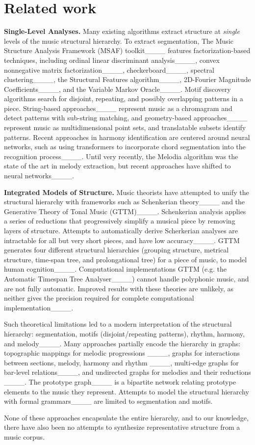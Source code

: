 \section{Related work}
\label{sec:related_work}

\noindent\textbf{Single-Level Analyses.}
Many existing algorithms extract structure at \textit{single} levels of the music structural hierarchy. To extract segmentation, The Music Structure Analysis Framework (MSAF) toolkit____ features factorization-based techniques, including ordinal linear discriminant analysis____, convex nonnegative matrix factorization____, checkerboard____, spectral clustering____, the Structural Features algorithm____, 2D-Fourier Magnitude Coefficients____, and the Variable Markov Oracle____. Motif discovery algorithms search for disjoint, repeating, and possibly overlapping patterns in a piece. String-based approaches____ represent music as a chromagram and detect patterns with sub-string matching, and geometry-based approaches____ represent music as multidimensional point sets, and translatable subsets identify patterns. Recent approaches in harmony identification are centered around neural networks, such as using transformers to incorporate chord segmentation into the recognition process____. Until very recently, the Melodia algorithm was the state of the art in melody extraction, but recent approaches have shifted to neural networks____. 

\smallskip\noindent\textbf{Integrated Models of Structure.}
Music theorists have attempted to unify the structural hierarchy with frameworks such as Schenkerian theory____ and the Generative Theory of Tonal Music (GTTM)____. Schenkerian analysis applies a series of reductions that progressively simplify a musical piece by removing layers of structure. Attempts to automatically derive Scherkerian analyses are intractable for all but very short pieces, and have low accuracy____. GTTM generates four different structural hierarchies (grouping structure, metrical structure, time-span tree, and prolongational tree) for a piece of music, to model human cognition____. Computational implementations GTTM (e.g. the Automatic Timespan Tree Analyser____) cannot handle polyphonic music, and are not fully automatic. Improved results with these theories are unlikely, as neither gives the precision required for complete computational implementation____.

Such theoretical limitations led to a modern interpretation of the structural hierarchy: segmentation, motifs (disjoint/repeating patterns), rhythm, harmony, and melody____. Many approaches partially encode the hierarchy in graphs: topographic mappings for melodic progressions ____, graphs for interactions between sections, melody, harmony and rhythm ____, multi-edge graphs for bar-level relations____, and undirected graphs for melodies and their reductions ____. The prototype graph____ is a bipartite network relating prototype elements to the music they represent. Attempts to model the structural hierarchy with formal grammars____ are limited to segmentation and motifs.

None of these approaches encapsulate the entire hierarchy, and to our knowledge, there have also been no attempts to synthesize representative structure from a music corpus.
